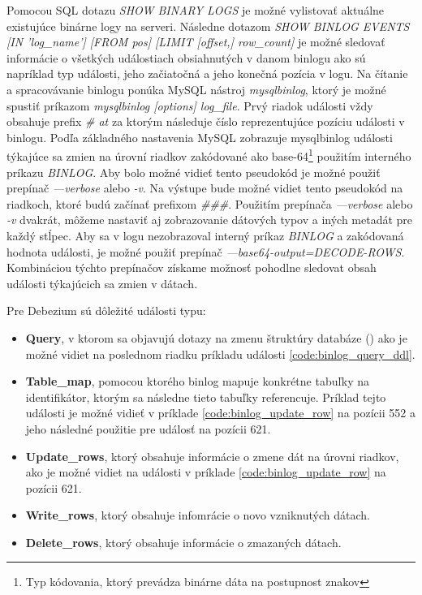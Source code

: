 Pomocou SQL dotazu \textit{SHOW BINARY LOGS} je možné vylistovať aktuálne existujúce binárne logy na serveri. Následne dotazom \textit{SHOW BINLOG EVENTS [IN 'log\_name']  [FROM pos] [LIMIT [offset,] row\_count]} je možné sledovať informácie o všetkých událostiach obsiahnutých v danom binlogu ako sú napríklad typ události, jeho začiatočná a jeho konečná pozícia v logu. Na čítanie a spracovávanie binlogu ponúka MySQL nástroj \textit{mysqlbinlog}, ktorý je možné spustiť príkazom \textit{mysqlbinlog [options] log\_file}. Prvý riadok události vždy obsahuje prefix \textit{\# at} za ktorým následuje číslo reprezentujúce pozíciu události v binlogu. Podľa základného nastavenia MySQL zobrazuje mysqlbinlog události týkajúce sa zmien na úrovní riadkov zakódované ako base-64\footnote{Typ kódovania, ktorý prevádza binárne dáta na postupnost znakov} použitím interného príkazu \textit{BINLOG}. Aby bolo možné vidieť tento pseudokód je možné použiť prepínač \textit{---verbose} alebo \textit{-v}. Na výstupe bude možné vidiet tento pseudokód na riadkoch, ktoré budú začínať prefixom  \textit{\#\#\#}. Použitím prepínača \textit{---verbose} alebo \textit{-v} dvakrát, môžeme nastaviť aj zobrazovanie dátových typov a iných metadát pre každý stĺpec. Aby sa v logu nezobrazoval interný príkaz \textit{BINLOG} a zakódovaná hodnota události, je možné použiť prepínač \textit{---base64-output=DECODE-ROWS}. Kombináciou týchto prepínačov získame možnosť pohodlne sledovat obsah události týkajúcich sa zmien v dátach. \cite{mysql:reference_manual}

Pre Debezium sú dôležité události typu:
\begin{itemize}
\item \textbf{Query}, v ktorom sa objavujú dotazy na zmenu štruktúry databáze () ako je možné vidiet na poslednom riadku príkladu události \ref{code:binlog_query_ddl}.
\item \textbf{Table\_map}, pomocou ktorého binlog mapuje konkrétne tabuľky na identifikátor, ktorým sa následne tieto tabuľky referencuje. Príklad tejto události je možné vidieť v príklade \ref{code:binlog_update_row} na pozícii 552 a jeho následné použitie pre událosť na pozícii 621. 
\item \textbf{Update\_rows}, ktorý obsahuje informácie o zmene dát na úrovni riadkov, ako je možné vidiet na události v príklade \ref{code:binlog_update_row} na pozícii 621.
\item \textbf{Write\_rows}, ktorý obsahuje infomrácie o novo vzniknutých dátach.
\item \textbf{Delete\_rows}, ktorý obsahuje informácie o zmazaných dátach.
\end{itemize}

